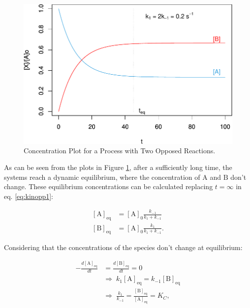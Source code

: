 \documentclass[
  9pt,
]{extbook}
\theoremstyle{definition}
\theoremstyle{definition}
\theoremstyle{definition}
\theoremstyle{remark}
\begin{document}
\begin{figure}

{\centering \includegraphics{pchem1_files/figure-latex/figkK-1} 

}

\caption{Concentration Plot for a Process with Two Opposed Reactions.}\label{fig:figkK}
\end{figure}

As can be seen from the plots in Figure \ref{fig:figkK}, after a sufficiently long time, the systems reach a dynamic equilibrium, where the concentration of \(\mathrm{A}\) and \(\mathrm{B}\) don't change. These equilibrium concentrations can be calculated replacing \(t=\infty\) in eq. \eqref{eq:kinopp1}:

\begin{equation}
\begin{aligned}
\left[\mathrm{A} \right] _{\mathrm{eq}} &= [\mathrm{A}]_0 \frac{k_{-1}}{k_1+k_{-1}} \\
[\mathrm{B}]_{\mathrm{eq}} &= [\mathrm{A}]_0 \frac{k_{1}}{k_1+k_{-1}}.
\end{aligned}
\label{eq:kinopp3}
\end{equation}

Considering that the concentrations of the species don't change at equilibrium:

\begin{equation}
\begin{aligned}
-\frac{d[\mathrm{A}]_{\mathrm{eq}}}{dt} &= \frac{d[\mathrm{B}]_{\mathrm{eq}}}{dt} = 0\\
& \Rightarrow \; k_1[\mathrm{A}]_{\mathrm{eq}} = k_{-1}[\mathrm{B}]_{\mathrm{eq}} \\
& \Rightarrow \;  \frac{k_1}{k_{-1}} =  \frac{[\mathrm{B}]_{\mathrm{eq}}}{[\mathrm{A}]_{\mathrm{eq}}} = K_C, \\
\end{aligned}
\label{eq:kinopp4}
\end{equation}
\end{document}
